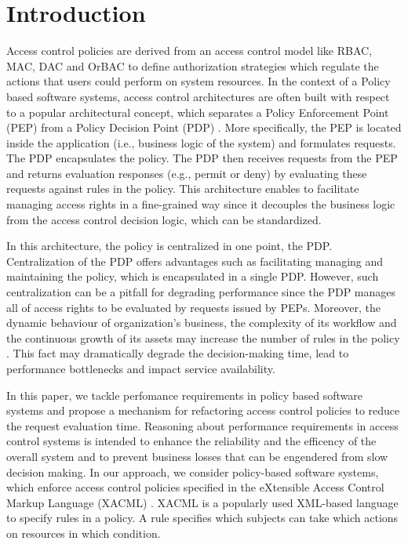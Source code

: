 
\section{Introduction} \label{sec:introduction}

Access control policies are derived from an access control model like RBAC, MAC, DAC and OrBAC \cite{dac,mac,rbac,orbac} to define authorization strategies which regulate the actions 
that users could perform on system resources. In the context of a Policy based software systems, access control architectures are often built with respect to a popular architectural 
concept, which separates a Policy Enforcement Point (PEP) from a Policy Decision Point (PDP) \cite{separation}. More specifically, the PEP is located inside 
the application (i.e., business logic of the system) and formulates requests.
The PDP encapsulates the policy. The PDP then receives requests from the PEP and returns evaluation responses (e.g., permit or deny) by evaluating these requests 
against rules in the policy. This architecture enables to facilitate managing access rights in a fine-grained way since it 
decouples the business logic from the access control decision logic, which can be standardized. 

In this architecture, the policy is centralized in one point, the PDP. Centralization of the PDP offers advantages such as facilitating managing and maintaining the policy, 
which is encapsulated in a single PDP. However, such centralization can be a pitfall for degrading performance since the PDP manages all of access rights to be evaluated by 
requests issued by PEPs. Moreover, the dynamic behaviour of organization's business, the complexity of its workflow and the continuous growth of its assets may increase the 
number of rules in the policy \cite{policymanagement}. This fact may dramatically degrade the decision-making time, lead to performance bottlenecks and impact service availability.

In this paper, we tackle perfomance requirements in policy based software systems and propose a mechanism for refactoring access control policies to reduce
the request evaluation time. Reasoning about performance requirements in access control systems is intended to enhance the reliability and the efficency of the overall system 
and to prevent business losses that can be engendered from slow decision making. In our approach, we consider policy-based software systems, which
enforce access control policies specified in the eXtensible Access Control Markup Language (XACML) \cite{sunxacml}. XACML is a popularly used XML-based language to specify rules 
in a policy. A rule specifies which subjects can take which actions on resources in which condition.

